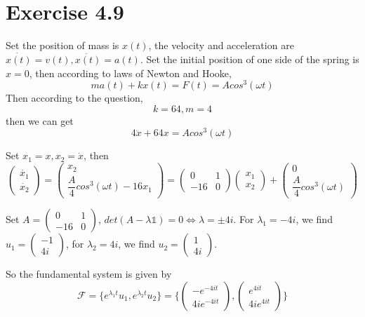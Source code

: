 \documentclass[a4paper,12pt,titlepage]{article}
\begin{document}
\section*{Exercise 4.9}
Set the position of mass is $x(t)$, the velocity and acceleration are $\dot{x(t)}=v(t),\ddot{x(t)}=a(t)$. Set the initial position of one side of the spring is $x=0$, then according to laws of Newton and Hooke, 
$$ma(t)+kx(t)=F(t)=Acos^3(\omega t)$$
Then according to the question, 
$$k=64,m=4$$
then we can get
$$4\ddot{x}+64x=Acos^3(\omega t) $$

Set $x_1=x,x_2=\dot{x}$, then
$$\begin{pmatrix}
\dot{x_1}\\
\dot{x_2}
\end{pmatrix}=\begin{pmatrix}
x_2\\
\dfrac{A}{4}cos^3(\omega t)-16x_1
\end{pmatrix}=\begin{pmatrix}
0&1\\
-16&0
\end{pmatrix}\begin{pmatrix}
x_1\\
x_2
\end{pmatrix}+\begin{pmatrix}
0\\
\dfrac{A}{4}cos^3(\omega t)
\end{pmatrix}
$$

Set $A=\begin{pmatrix}
0&1\\
-16&0
\end{pmatrix}$, $det(A-\lambda\mathds{1})=0\Leftrightarrow \lambda=\pm4i$. For $\lambda_1=-4i$, we find $u_1=\begin{pmatrix}
-1\\
4i
\end{pmatrix}$, for $\lambda_2=4i$, we find $u_2=\begin{pmatrix}
1\\
4i
\end{pmatrix}$.

So the fundamental system is given by
$$\mathscr{F}=\lbrace e^{\lambda_1t}u_1,e^{\lambda_2t}u_2\rbrace=\lbrace\begin{pmatrix}
-e^{-4it}\\
4ie^{-4it}
\end{pmatrix},\begin{pmatrix}
e^{4it}\\
4ie^{4it}
\end{pmatrix}\rbrace$$
\end{document}
